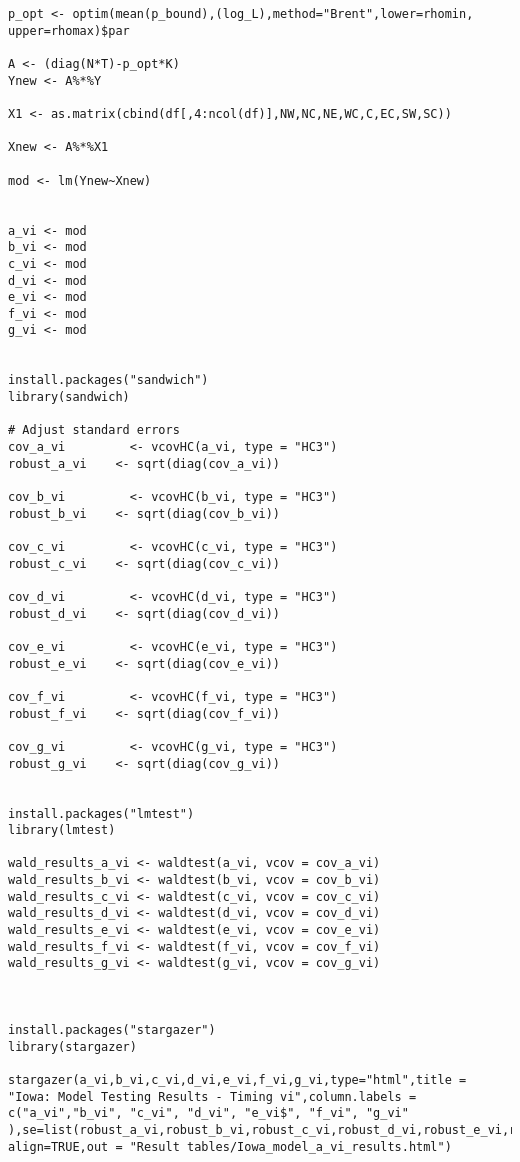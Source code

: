 \begin{lstlisting}
p_opt <- optim(mean(p_bound),(log_L),method="Brent",lower=rhomin, upper=rhomax)$par

A <- (diag(N*T)-p_opt*K)
Ynew <- A%*%Y

X1 <- as.matrix(cbind(df[,4:ncol(df)],NW,NC,NE,WC,C,EC,SW,SC))

Xnew <- A%*%X1

mod <- lm(Ynew~Xnew)


a_vi <- mod
b_vi <- mod
c_vi <- mod
d_vi <- mod
e_vi <- mod
f_vi <- mod
g_vi <- mod


install.packages("sandwich")
library(sandwich)

# Adjust standard errors
cov_a_vi         <- vcovHC(a_vi, type = "HC3")
robust_a_vi    <- sqrt(diag(cov_a_vi))

cov_b_vi         <- vcovHC(b_vi, type = "HC3")
robust_b_vi    <- sqrt(diag(cov_b_vi))

cov_c_vi         <- vcovHC(c_vi, type = "HC3")
robust_c_vi    <- sqrt(diag(cov_c_vi))

cov_d_vi         <- vcovHC(d_vi, type = "HC3")
robust_d_vi    <- sqrt(diag(cov_d_vi))

cov_e_vi         <- vcovHC(e_vi, type = "HC3")
robust_e_vi    <- sqrt(diag(cov_e_vi))

cov_f_vi         <- vcovHC(f_vi, type = "HC3")
robust_f_vi    <- sqrt(diag(cov_f_vi))

cov_g_vi         <- vcovHC(g_vi, type = "HC3")
robust_g_vi    <- sqrt(diag(cov_g_vi))


install.packages("lmtest")
library(lmtest)

wald_results_a_vi <- waldtest(a_vi, vcov = cov_a_vi)
wald_results_b_vi <- waldtest(b_vi, vcov = cov_b_vi)
wald_results_c_vi <- waldtest(c_vi, vcov = cov_c_vi)
wald_results_d_vi <- waldtest(d_vi, vcov = cov_d_vi)
wald_results_e_vi <- waldtest(e_vi, vcov = cov_e_vi)
wald_results_f_vi <- waldtest(f_vi, vcov = cov_f_vi)
wald_results_g_vi <- waldtest(g_vi, vcov = cov_g_vi)



install.packages("stargazer")
library(stargazer)

stargazer(a_vi,b_vi,c_vi,d_vi,e_vi,f_vi,g_vi,type="html",title = "Iowa: Model Testing Results - Timing vi",column.labels = c("a_vi","b_vi", "c_vi", "d_vi", "e_vi$", "f_vi", "g_vi" ),se=list(robust_a_vi,robust_b_vi,robust_c_vi,robust_d_vi,robust_e_vi,robust_f_vi,robust_g_vi), align=TRUE,out = "Result tables/Iowa_model_a_vi_results.html")


\end{lstlisting}


